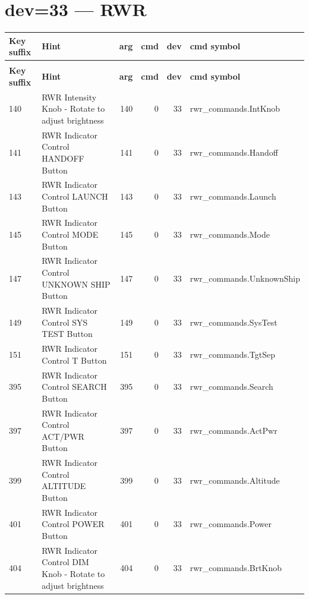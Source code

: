 \documentclass[10pt,a4paper]{article}
\begin{document}
\section{dev=33 — RWR}
\begin{longtable}{>{\ttfamily\small}p{38mm} >{\small}p{72mm} r r r >{\ttfamily\small}p{48mm}}
\toprule
\textbf{Key suffix} & \textbf{Hint} & \textbf{arg} & \textbf{cmd} & \textbf{dev} & \textbf{cmd symbol} \\
\midrule
\endfirsthead
\multicolumn{6}{l}{\small\itshape continued\ldots}\\
\toprule
\textbf{Key suffix} & \textbf{Hint} & \textbf{arg} & \textbf{cmd} & \textbf{dev} & \textbf{cmd symbol} \\
\midrule
\endhead
\bottomrule
\endfoot
\rowcolor{rowodd}
  140 & RWR Intensity Knob - Rotate to adjust brightness & 140 & 0 & 33 & rwr\_commands.IntKnob \\
  141 & RWR Indicator Control HANDOFF Button & 141 & 0 & 33 & rwr\_commands.Handoff \\
\rowcolor{rowodd}
  143 & RWR Indicator Control LAUNCH Button & 143 & 0 & 33 & rwr\_commands.Launch \\
  145 & RWR Indicator Control MODE Button & 145 & 0 & 33 & rwr\_commands.Mode \\
\rowcolor{rowodd}
  147 & RWR Indicator Control UNKNOWN SHIP Button & 147 & 0 & 33 & rwr\_commands.UnknownShip \\
  149 & RWR Indicator Control SYS TEST Button & 149 & 0 & 33 & rwr\_commands.SysTest \\
\rowcolor{rowodd}
  151 & RWR Indicator Control T Button & 151 & 0 & 33 & rwr\_commands.TgtSep \\
  395 & RWR Indicator Control SEARCH Button & 395 & 0 & 33 & rwr\_commands.Search \\
\rowcolor{rowodd}
  397 & RWR Indicator Control ACT/PWR Button & 397 & 0 & 33 & rwr\_commands.ActPwr \\
  399 & RWR Indicator Control ALTITUDE Button & 399 & 0 & 33 & rwr\_commands.Altitude \\
\rowcolor{rowodd}
  401 & RWR Indicator Control POWER Button & 401 & 0 & 33 & rwr\_commands.Power \\
  404 & RWR Indicator Control DIM Knob - Rotate to adjust brightness & 404 & 0 & 33 & rwr\_commands.BrtKnob \\
\end{longtable}
\end{document}
